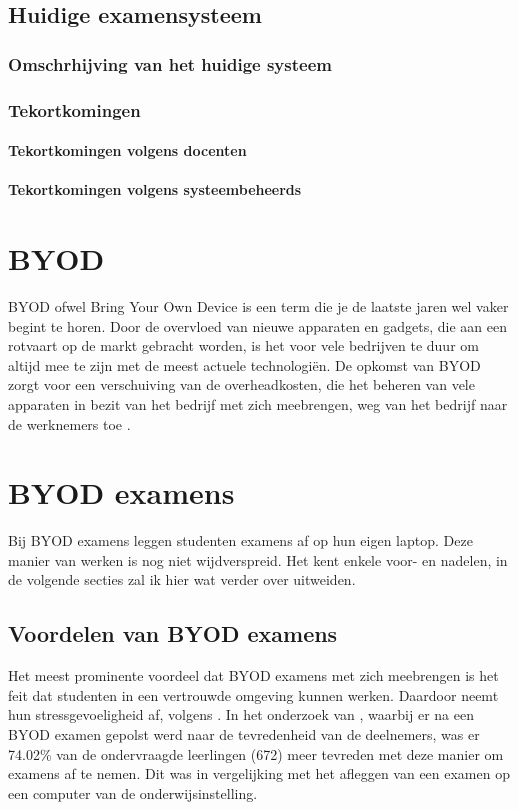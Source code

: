 \subsection{Huidige examensysteem}

\subsubsection{Omschrhijving van het huidige systeem}

\subsubsection{Tekortkomingen}

\paragraph{Tekortkomingen volgens docenten}

\paragraph{Tekortkomingen volgens systeembeheerds}

\section{BYOD}

BYOD ofwel Bring Your Own Device is een term die je de laatste jaren wel vaker begint te horen. Door de overvloed van nieuwe apparaten en gadgets, die aan een rotvaart op de markt gebracht worden, is het voor vele bedrijven te duur om altijd mee te zijn met de meest actuele technologiën. De opkomst van BYOD zorgt voor een verschuiving van de overheadkosten, die het beheren van vele apparaten in bezit van het bedrijf met zich meebrengen, weg van het bedrijf naar de werknemers toe \autocite{Hong2016}.

\section{BYOD examens}
Bij BYOD examens leggen studenten examens af op hun eigen laptop. Deze manier van werken is nog niet wijdverspreid. Het kent enkele voor- en nadelen, in de volgende secties zal ik hier wat verder over uitweiden. 

\subsection{Voordelen van BYOD examens}
Het meest prominente voordeel dat BYOD examens met zich meebrengen is het feit dat studenten in een vertrouwde omgeving kunnen werken. Daardoor neemt hun stressgevoeligheid af, volgens
\textcite{TeckSwee2014}. In het onderzoek van \textcite{TeckSwee2014}, waarbij er na een BYOD examen gepolst werd naar de tevredenheid van de deelnemers, was er 74.02\% van de ondervraagde leerlingen (672) meer tevreden met deze manier om examens af te nemen. Dit was in vergelijking met het afleggen van een examen op een computer van de onderwijsinstelling. 

